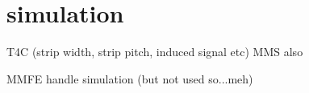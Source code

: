 
\section{simulation}

T4C (strip width, strip pitch, induced signal etc)
MMS also

MMFE handle simulation (but not used so...meh)

